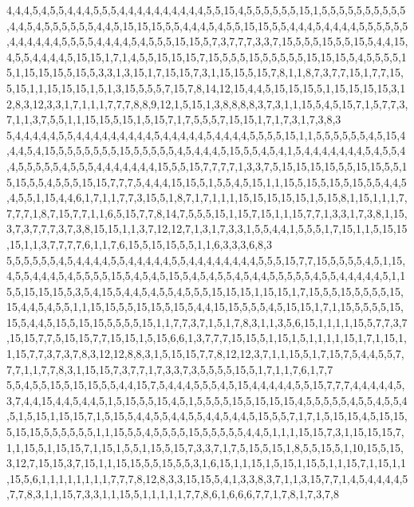 4,4,4,5,4,5,5,4,4,4,5,5,5,4,4,4,4,4,4,4,4,4,4,5,5,15,4,5,5,5,5,5,5,15,1,5,5,5,5,5,5,5,5,5,5,4,4,5,4,5,5,5,5,5,5,4,4,5,15,15,15,5,5,4,4,4,5,4,5,5,15,15,5,5,4,4,4,5,4,4,4,4,5,5,5,5,5,5,4,4,4,4,4,4,5,5,5,5,4,4,4,4,5,4,5,5,5,15,15,5,7,3,7,7,7,3,3,7,15,5,5,5,15,5,5,15,5,4,4,15,4,5,5,4,4,4,4,5,15,15,1,7,1,4,5,5,15,15,15,7,15,5,5,5,15,5,5,5,5,5,15,15,15,5,4,5,5,5,5,15,1,15,15,15,5,15,5,3,3,1,3,15,1,7,15,15,7,3,1,15,15,5,15,7,8,1,1,8,7,3,7,7,15,1,7,7,15,5,15,1,1,15,15,15,1,5,1,3,15,5,5,5,7,15,7,8,14,12,15,4,4,5,15,15,15,5,1,15,15,15,15,3,12,8,3,12,3,3,1,7,1,1,1,7,7,7,8,8,9,12,1,5,15,1,3,8,8,8,8,3,7,3,1,1,15,5,4,5,15,7,1,5,7,7,3,7,1,1,3,7,5,5,1,1,15,15,5,15,1,5,15,7,1,7,5,5,5,7,15,15,1,7,1,7,3,1,7,3,8,3
5,4,4,4,4,4,5,5,4,4,4,4,4,4,4,4,4,5,4,4,4,4,4,5,4,4,4,4,5,5,5,5,15,1,1,5,5,5,5,5,5,4,5,15,4,4,4,5,4,15,5,5,5,5,5,5,5,15,5,5,5,5,5,4,5,4,4,4,5,15,5,5,4,5,4,1,5,4,4,4,4,4,4,4,5,4,5,5,4,4,5,5,5,5,5,4,5,5,5,4,4,4,4,4,4,4,15,5,5,15,7,7,7,7,1,3,3,7,5,15,15,15,15,5,5,15,15,5,5,15,15,5,5,4,5,5,5,15,15,7,7,7,5,4,4,4,15,15,5,1,5,5,4,5,15,1,1,15,5,15,5,15,5,15,5,5,4,4,5,4,5,5,1,15,4,4,6,1,7,1,1,7,7,3,15,5,1,8,7,1,7,1,1,1,15,15,15,15,15,1,5,15,8,1,15,1,1,1,7,7,7,7,1,8,7,15,7,7,1,1,6,5,15,7,7,8,14,7,5,5,5,15,1,15,7,15,1,1,15,7,7,1,3,3,1,7,3,8,1,15,3,7,3,7,7,7,3,7,3,8,15,15,1,1,3,7,12,12,7,1,3,1,7,3,3,1,5,5,4,4,1,5,5,5,1,7,15,1,1,5,15,15,15,1,1,3,7,7,7,7,6,1,1,7,6,15,5,15,15,5,5,1,1,6,3,3,3,6,8,3
5,5,5,5,5,5,4,5,4,4,4,4,5,5,4,4,4,4,4,5,5,4,4,4,4,4,4,4,4,5,5,5,15,7,7,15,5,5,5,5,4,5,1,15,4,5,5,4,4,4,5,4,5,5,5,5,15,5,4,5,4,5,15,5,4,5,4,5,5,4,5,4,4,5,5,5,5,5,4,5,5,4,4,4,4,4,5,1,15,5,15,15,15,5,3,5,4,15,5,4,4,5,4,5,5,4,5,5,5,15,15,15,1,15,15,1,7,15,5,5,15,5,5,5,5,15,15,4,4,5,4,5,5,1,1,15,15,5,5,15,15,5,15,5,4,4,15,15,5,5,5,4,5,15,15,1,7,1,15,5,5,5,5,15,15,5,4,4,5,15,5,15,15,5,5,5,5,15,1,1,7,7,3,7,1,5,1,7,8,3,1,1,3,5,6,15,1,1,1,1,15,5,7,7,3,7,15,15,7,7,5,15,15,7,7,15,15,1,5,15,6,6,1,3,7,7,7,15,15,5,1,15,1,5,1,1,1,1,15,1,7,1,15,1,1,15,7,7,3,7,3,7,8,3,12,12,8,8,3,1,5,15,15,7,7,8,12,12,3,7,1,1,15,5,1,7,15,7,5,4,4,5,5,7,7,7,1,1,7,7,8,3,1,15,15,7,3,7,7,1,7,3,3,7,3,5,5,5,5,15,5,1,7,1,1,7,6,1,7,7
5,5,4,5,5,15,5,15,15,5,5,4,4,15,7,5,4,4,4,5,5,5,4,5,15,4,4,4,4,4,5,5,15,7,7,7,4,4,4,4,4,5,3,7,4,4,15,4,4,5,4,4,5,1,5,15,5,5,15,4,5,1,5,5,5,5,15,5,15,15,15,4,5,5,5,5,5,4,5,5,4,5,5,4,5,1,5,15,1,15,15,7,1,5,15,5,4,4,5,5,4,4,5,5,4,4,5,4,4,5,15,5,5,7,1,7,1,5,15,15,4,5,15,15,5,15,15,5,5,5,5,5,5,1,1,15,5,5,4,5,5,5,5,15,5,5,5,5,5,4,4,5,1,1,1,15,15,7,3,1,15,15,15,7,1,1,15,5,1,15,15,7,1,15,1,5,5,1,15,5,15,7,3,3,7,1,7,5,15,5,15,1,8,5,5,15,5,1,10,15,5,15,3,12,7,15,15,3,7,15,1,1,15,15,5,5,15,5,5,3,1,6,15,1,1,15,1,5,15,1,15,5,1,1,15,7,1,15,1,1,15,5,6,1,1,1,1,1,1,1,1,7,7,7,8,12,8,3,3,15,15,5,4,1,3,3,8,3,7,1,1,3,15,7,7,1,4,5,4,4,4,4,5,7,7,8,3,1,1,15,7,3,3,1,1,15,5,1,1,1,1,1,7,7,8,6,1,6,6,6,7,7,1,7,8,1,7,3,7,8
